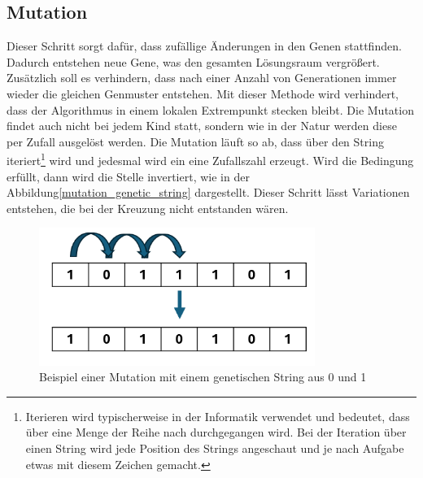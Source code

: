 %
%
%
%
\subsection{Mutation
\label{buch:paper:varalg:subsection:mutation}}
Dieser Schritt sorgt dafür, dass zufällige Änderungen in 
den Genen stattfinden. Dadurch entstehen neue Gene, was den 
gesamten Lösungsraum vergrößert. Zusätzlich soll es verhindern,
dass nach einer Anzahl von Generationen immer wieder die
gleichen Genmuster entstehen. Mit dieser Methode wird
verhindert, dass der Algorithmus in einem lokalen Extrempunkt
stecken bleibt. Die Mutation findet auch nicht bei jedem Kind
statt, sondern wie in der Natur werden diese per Zufall
ausgelöst werden. Die Mutation läuft so ab, dass über den String
iteriert\footnote{
    Iterieren wird typischerweise in der Informatik verwendet und 
	bedeutet, dass über eine Menge der Reihe nach durchgegangen wird. 
	Bei der Iteration über einen String wird jede Position des Strings 
	angeschaut und je nach Aufgabe etwas mit diesem Zeichen gemacht.
    } 
wird und jedesmal wird ein eine Zufallszahl erzeugt. Wird 
die Bedingung erfüllt, dann wird die Stelle invertiert, wie in der
Abbildung\ref{mutation_genetic_string} dargestellt. Dieser Schritt 
lässt Variationen entstehen, die bei der Kreuzung nicht entstanden wären.  
\begin{figure}
	\centering
	\includegraphics[width=0.8\textwidth]{
        papers/varalg/images/teil3/09GeneticStringMutation.png
        }
	\caption{Beispiel einer Mutation mit einem genetischen String aus 0 und 1}
	\label{fig:mutation_genetic_string}
\end{figure}

